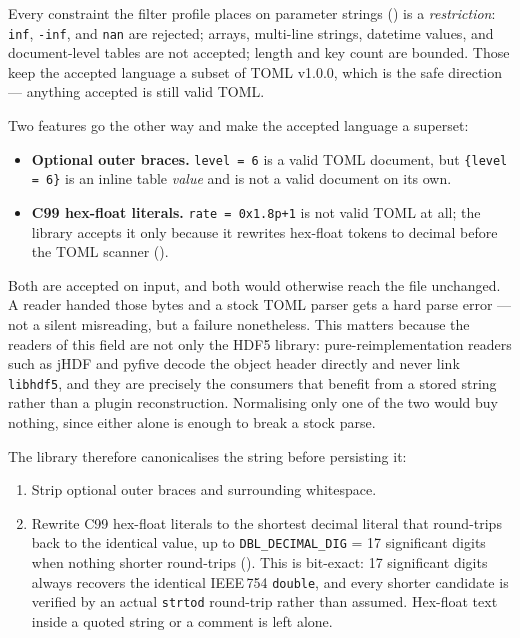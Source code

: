 \documentclass[../RFC-HDFG-2026-001.tex]{subfiles}
\begin{document}
Every constraint the filter profile places on parameter strings
() is a \emph{restriction}: \texttt{inf},
\texttt{-inf}, and \texttt{nan} are rejected; arrays, multi-line strings,
datetime values, and document-level tables are not accepted; length and
key count are bounded.  Those keep the accepted language a subset of TOML
v1.0.0, which is the safe direction --- anything accepted is still valid
TOML.

Two features go the other way and make the accepted language a superset:

\begin{itemize}
\item \textbf{Optional outer braces.}  \texttt{level = 6} is a valid TOML
  document, but \texttt{\{level = 6\}} is an inline table \emph{value} and
  is not a valid document on its own.
\item \textbf{C99 hex-float literals.}  \texttt{rate = 0x1.8p+1} is not
  valid TOML at all; the library accepts it only because it rewrites
  hex-float tokens to decimal before the TOML scanner
  ().
\end{itemize}

Both are accepted on input, and both would otherwise reach the file
unchanged.  A reader handed those bytes and a stock TOML parser gets a hard
parse error --- not a silent misreading, but a failure nonetheless.  This
matters because the readers of this field are not only the HDF5 library:
pure-reimplementation readers such as jHDF and pyfive decode the object
header directly and never link \texttt{libhdf5}, and they are precisely the
consumers that benefit from a stored string rather than a plugin
reconstruction.  Normalising only one of the two would buy nothing, since
either alone is enough to break a stock parse.

The library therefore canonicalises the string before persisting it:

\begin{enumerate}
\item Strip optional outer braces and surrounding whitespace.
\item Rewrite C99 hex-float literals to the shortest decimal literal that
  round-trips back to the identical value, up to
  \texttt{DBL\_DECIMAL\_DIG} = 17 significant digits when nothing shorter
  round-trips ().  This is bit-exact: 17
  significant digits always recovers the identical IEEE\,754
  \texttt{double}, and every shorter candidate is verified by an actual
  \texttt{strtod} round-trip rather than assumed.  Hex-float text inside a
  quoted string or a comment is left alone.
\end{enumerate}
\end{document}
